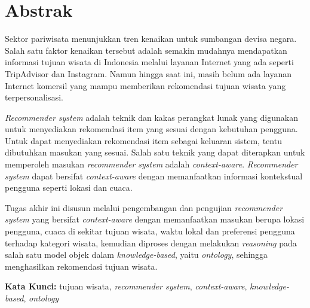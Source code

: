 \chapter*{Abstrak}

\par
Sektor pariwisata menunjukkan tren kenaikan untuk sumbangan devisa negara. Salah satu faktor kenaikan tersebut adalah semakin mudahnya mendapatkan informasi tujuan wisata di Indonesia 
melalui layanan Internet yang ada seperti TripAdvisor dan Instagram. Namun hingga saat ini, masih belum ada layanan Internet komersil yang mampu memberikan rekomendasi tujuan wisata 
yang terpersonalisasi. 
\par
\textit{Recommender system} adalah teknik dan kakas perangkat lunak yang digunakan untuk menyediakan rekomendasi item yang sesuai dengan kebutuhan pengguna. 
Untuk dapat menyediakan rekomendasi item sebagai keluaran sistem, tentu dibutuhkan masukan yang sesuai. 
Salah satu teknik yang dapat diterapkan untuk memperoleh masukan \textit{recommender system} adalah \textit{context-aware}. \textit{Recommender system} dapat bersifat \textit{context-aware} dengan memanfaatkan informasi kontekstual pengguna seperti lokasi dan cuaca.
\par
Tugas akhir ini disusun melalui pengembangan dan pengujian \textit{recommender system} yang bersifat \textit{context-aware} dengan 
memanfaatkan masukan berupa lokasi pengguna, cuaca di sekitar tujuan wisata, waktu lokal dan preferensi pengguna terhadap kategori wisata, 
kemudian diproses dengan melakukan \textit{reasoning} pada salah satu model objek dalam \textit{knowledge-based}, yaitu \textit{ontology}, sehingga menghasilkan rekomendasi tujuan wisata.

\vspace{0.5 cm}
\begin{flushleft}
{\textbf{Kata Kunci:} tujuan wisata, \textit{recommender system}, \textit{context-aware}, \textit{knowledge-based}, \textit{ontology}}
\end{flushleft}